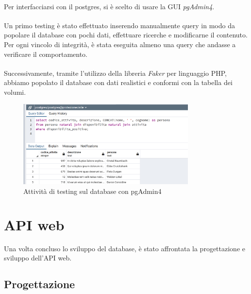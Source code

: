 \documentclass[11pt,a4paper,english]{article}
\begin{document}
\paragraph{} Per interfacciarsi con il postgres, si è scelto di usare la GUI \emph{pgAdmin4}.

\paragraph{} Un primo testing è stato effettuato inserendo manualmente query in modo da popolare il database con pochi dati, effettuare ricerche e modificarne il contenuto. Per ogni vincolo di integrità, è stata eseguita almeno una query che andasse a verificare il comportamento. 

\paragraph{} Successivamente, tramite l'utilizzo della libreria \emph{Faker} per linguaggio PHP, abbiamo popolato il database con dati realistici e conformi con la tabella dei volumi.

\begin{figure}[H]
    \centering
    \includegraphics[width=0.8\textwidth]{img/query_esempio.png}
    \caption{Attività di testing sul database con pgAdmin4}
\end{figure}



\section{API web}

\paragraph{} Una volta concluso lo sviluppo del database, è stato affrontata la progettazione e sviluppo dell'API web.

\subsection{Progettazione}
\end{document}
